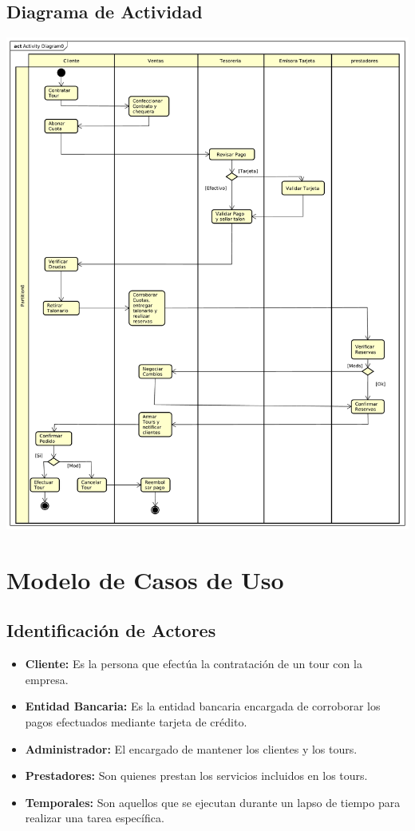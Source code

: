 \documentclass[12pt,a4paper]{article}
\begin{document}
	\newpage
	\subsection{Diagrama de Actividad}
		\includegraphics[scale=0.45]{images/Activity_Diagram0.pdf}

\newpage
\section{Modelo de Casos de Uso}
	\subsection{Identificación de Actores}
		\begin{itemize}
			\item \textbf{Cliente:} Es la persona que efectúa la contratación de un tour con la empresa.
			\item \textbf{Entidad Bancaria:} Es la entidad bancaria encargada de corroborar los pagos efectuados mediante tarjeta de crédito.
			\item \textbf{Administrador:} El encargado de mantener los clientes y los tours.
			\item \textbf{Prestadores:} Son quienes prestan los servicios incluidos en los tours.
			\item \textbf{Temporales:} Son aquellos que se ejecutan durante un lapso de tiempo para realizar una tarea específica.
		\end{itemize}
\end{document}
